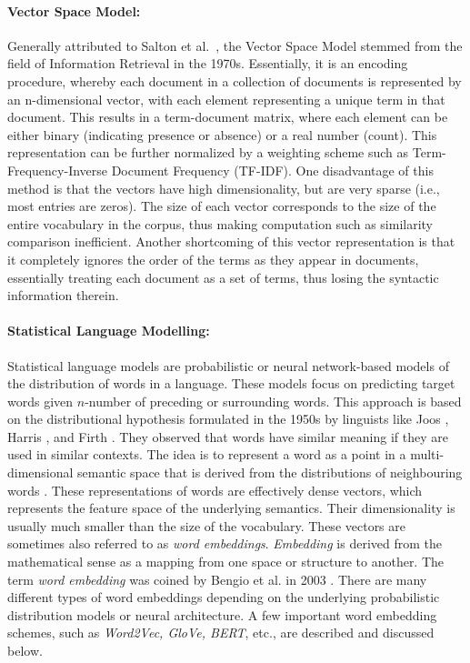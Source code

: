 \paragraph{Vector Space Model:} Generally attributed to Salton et al.~\cite{Salton75}, the Vector Space Model stemmed from the field of Information Retrieval in the 1970s. Essentially, it is an encoding procedure, whereby each document in a collection of documents is represented by an n-dimensional vector, with each element representing a unique term in that document. This results in a term-document matrix, where each element can be either binary (indicating presence or absence) or a real number (count). This representation can be further normalized by a weighting scheme such as Term-Frequency-Inverse Document Frequency (TF-IDF). One disadvantage of this method is that the vectors have high dimensionality, but are very sparse (i.e., most entries are zeros). The size of each vector corresponds to the size of the entire vocabulary in the corpus, thus making computation such as similarity comparison inefficient. Another shortcoming of this vector representation is that it completely ignores the order of the terms as they appear in documents, essentially treating each document as a set of terms, thus losing the syntactic information therein.

\paragraph{Statistical Language Modelling:} Statistical language models are probabilistic or neural network-based models of the distribution of words in a language. These models focus on predicting target words given $n$-number of preceding or surrounding words. This approach is based on the distributional hypothesis formulated in the 1950s by linguists like Joos \cite{Joos50}, Harris \cite{harris54}, and Firth \cite{firth57}. They observed that words have similar meaning if they are used in similar contexts. The idea is to represent a word as a point in a multi-dimensional semantic space that is derived from the distributions of neighbouring words \cite{Jurafsky2009}. These representations of words are effectively dense vectors, which represents the feature space of the underlying semantics. Their dimensionality is usually much smaller than the size of the vocabulary. These vectors are sometimes also referred to as \emph{word embeddings}. \emph{Embedding} is derived from the mathematical sense as a mapping from one space or structure to another. The term \emph{word embedding} was coined by Bengio et al. in 2003 \cite{Bengio2003}. There are many different types of word embeddings depending on the underlying probabilistic distribution models or neural architecture. A few important word embedding schemes, such as \emph{Word2Vec, GloVe, BERT}, etc., are described and discussed below. 

